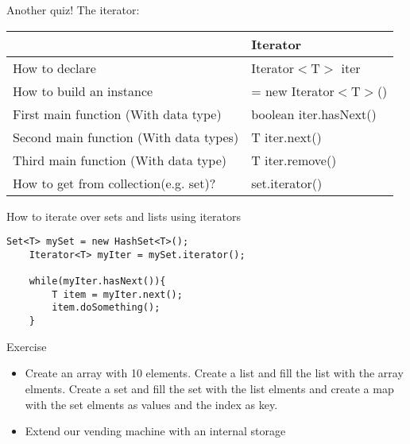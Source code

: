 \begin{frame}{Another quiz!}
	The iterator:\\
	\vspace{1cm}
	\begin{tabular}{l|l}
		&Iterator\\
		\hline
		How to declare&Iterator$<$T$>$ iter\\
		\hline
		How to build an instance&= new Iterator$<$T$>$()\\
		\hline
		First main function (With data type)&boolean iter.hasNext()\\
		\hline
		Second main function (With data types)&T iter.next()\\
		\hline
		Third main function (With data type)&T iter.remove()\\
		\hline
		How to get from collection(e.g. set)?&set.iterator()\\
		
	\end{tabular}
\end{frame}

\begin{frame}[fragile]{How to iterate over sets and lists using iterators}
	\begin{lstlisting}[basicstyle=\ttfamily\scriptsize]
	Set<T> mySet = new HashSet<T>();
	Iterator<T> myIter = mySet.iterator();
	
	while(myIter.hasNext()){
		T item = myIter.next();
		item.doSomething();
	}
	\end{lstlisting}
\end{frame}

\begin{frame}{Exercise}
	\begin{itemize}
		\item Create an array with 10 elements. Create a list and fill the list with the array 		elments. Create a set and fill the set with the list elments and create a map with the set elments as values and the index as key.
		\item Extend our vending machine with an internal storage
	\end{itemize}
\end{frame}

